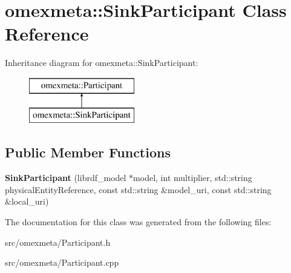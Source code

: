 \hypertarget{classomexmeta_1_1SinkParticipant}{}\section{omexmeta\+:\+:Sink\+Participant Class Reference}
\label{classomexmeta_1_1SinkParticipant}
Inheritance diagram for omexmeta\+:\+:Sink\+Participant\+:\begin{figure}[H]
\begin{center}
\leavevmode
\includegraphics[height=2.000000cm]{classomexmeta_1_1SinkParticipant}
\end{center}
\end{figure}
\subsection*{Public Member Functions}
\begin{DoxyCompactItemize}
\item 
\mbox{\label{classomexmeta_1_1SinkParticipant_a0adac71db2271549cbb6dc17346d89b7}} 
{\bfseries Sink\+Participant} (librdf\+\_\+model $\ast$model, int multiplier, std\+::string physical\+Entity\+Reference, const std\+::string \&model\+\_\+uri, const std\+::string \&local\+\_\+uri)
\end{DoxyCompactItemize}


The documentation for this class was generated from the following files\+:\begin{DoxyCompactItemize}
\item 
src/omexmeta/Participant.\+h\item 
src/omexmeta/Participant.\+cpp\end{DoxyCompactItemize}

